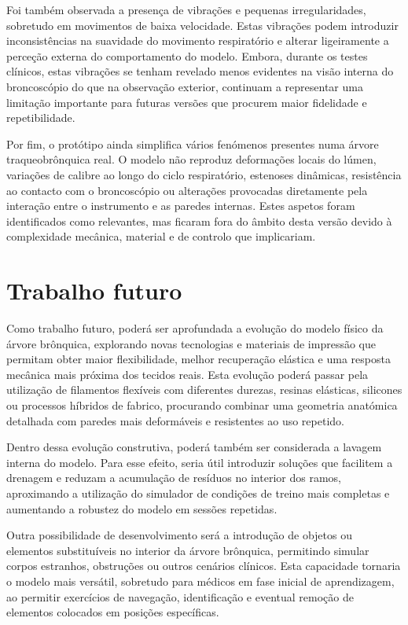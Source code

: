 Foi também observada a presença de vibrações e pequenas irregularidades, sobretudo em movimentos de baixa velocidade. Estas vibrações podem introduzir inconsistências na suavidade do movimento respiratório e alterar ligeiramente a perceção externa do comportamento do modelo. Embora, durante os testes clínicos, estas vibrações se tenham revelado menos evidentes na visão interna do broncoscópio do que na observação exterior, continuam a representar uma limitação importante para futuras versões que procurem maior fidelidade e repetibilidade.

Por fim, o protótipo ainda simplifica vários fenómenos presentes numa árvore traqueobrônquica real. O modelo não reproduz deformações locais do lúmen, variações de calibre ao longo do ciclo respiratório, estenoses dinâmicas, resistência ao contacto com o broncoscópio ou alterações provocadas diretamente pela interação entre o instrumento e as paredes internas. Estes aspetos foram identificados como relevantes, mas ficaram fora do âmbito desta versão devido à complexidade mecânica, material e de controlo que implicariam.

\section{Trabalho futuro}
Como trabalho futuro, poderá ser aprofundada a evolução do modelo físico da árvore brônquica, explorando novas tecnologias e materiais de impressão que permitam obter maior flexibilidade, melhor recuperação elástica e uma resposta mecânica mais próxima dos tecidos reais. Esta evolução poderá passar pela utilização de filamentos flexíveis com diferentes durezas, resinas elásticas, silicones ou processos híbridos de fabrico, procurando combinar uma geometria anatómica detalhada com paredes mais deformáveis e resistentes ao uso repetido.

Dentro dessa evolução construtiva, poderá também ser considerada a lavagem interna do modelo. Para esse efeito, seria útil introduzir soluções que facilitem a drenagem e reduzam a acumulação de resíduos no interior dos ramos, aproximando a utilização do simulador de condições de treino mais completas e aumentando a robustez do modelo em sessões repetidas.

Outra possibilidade de desenvolvimento será a introdução de objetos ou elementos substituíveis no interior da árvore brônquica, permitindo simular corpos estranhos, obstruções ou outros cenários clínicos. Esta capacidade tornaria o modelo mais versátil, sobretudo para médicos em fase inicial de aprendizagem, ao permitir exercícios de navegação, identificação e eventual remoção de elementos colocados em posições específicas.

